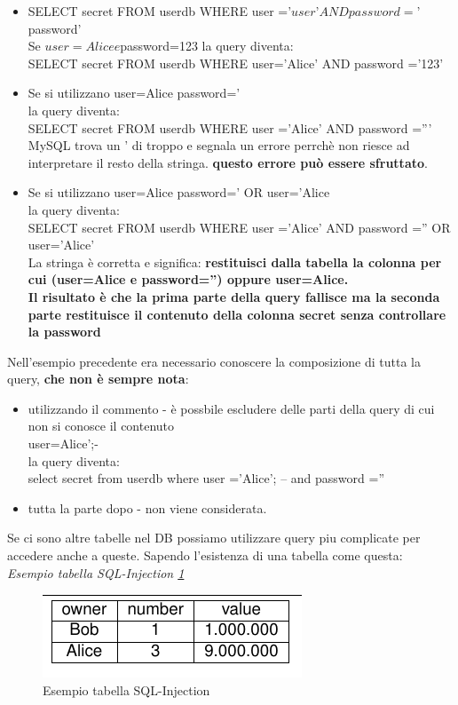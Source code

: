 \documentclass[12pt]{article}
\begin{document}
				\begin{itemize}
					\item SELECT secret FROM userdb WHERE user =’$user’ AND password =’$password’\\
					Se $user=Alice e $password=123 la query diventa:\\
					SELECT secret FROM userdb WHERE user=’Alice’ AND password =’123’
					\item Se si utilizzano
					user=Alice
					password=’\\
					la query diventa:\\
					SELECT secret FROM userdb WHERE user =’Alice’ AND password =”’\\
					MySQL trova un ' di troppo e segnala un errore perrchè non riesce ad interpretare il resto della stringa. \textbf{questo errore può essere sfruttato}.
					\item Se si utilizzano
					user=Alice
					password=’ OR user=’Alice\\
					la query diventa:\\ SELECT secret FROM userdb WHERE user =’Alice’
					AND password =” OR user=’Alice’\\
					La stringa è corretta e significa: \textbf{restituisci dalla tabella la colonna per cui
					(user=Alice e password=”) oppure user=Alice.\\
					Il risultato è che la prima parte della query fallisce ma la seconda parte
					restituisce il contenuto della colonna secret senza controllare la password}
				\end{itemize}
				Nell'esempio precedente era necessario conoscere la composizione di tutta la query, \textbf{che non è sempre nota}:
				\begin{itemize}
					\item utilizzando il commento - è possbile escludere delle parti della query di cui non si conosce il contenuto\\
					user=Alice';-\\
					la query diventa:\\
					select secret from userdb where user =’Alice’; – and password =”
					\item tutta la parte dopo - non viene considerata.
				\end{itemize}
				Se ci sono altre tabelle nel DB possiamo utilizzare query piu complicate per accedere anche a queste. Sapendo l'esistenza di una tabella come questa:\\
				
				\textit{Esempio tabella SQL-Injection \ref{fig:31}}\\
				\begin{figure}[h!]
					\centering
					\includegraphics[scale=0.60]{img/table.PNG}
					\caption{Esempio tabella SQL-Injection \label{fig:31}}
				\end{figure}\\
				
\end{document}
